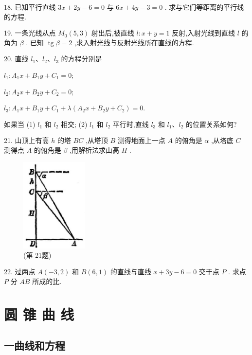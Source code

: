 \documentclass[lang=cn,newtx,10pt,scheme=chinese]{elegantbook}
\begin{document}
18. 已知平行直线 \({3x} + {2y} - 6 = 0\) 与 \({6x} + {4y} - 3 = 0\) . 求与它们等距离的平行线的方程.

19. 一条光线从点 \({M}_{0}\left( {5,3}\right)\) 射出后,被直线 \(l : x + y = 1\) 反射,入射光线到直线 \(l\) 的角为 \(\beta\) . 已知 \(\operatorname{tg}\beta = 2\) ,求入射光线与反射光线所在直线的方程.

20. 直线 \({l}_{1}\text{、}{l}_{2}\text{、}{l}_{3}\) 的方程分别是

\({l}_{1} : {A}_{1}x + {B}_{1}y + {C}_{1} = 0;\)

\({l}_{2} : {A}_{2}x + {B}_{2}y + {C}_{2} = 0;\)

\({l}_{3} : {A}_{1}x + {B}_{1}y + {C}_{1} + \lambda \left( {{A}_{2}x + {B}_{2}y + {C}_{2}}\right) = 0.\)

如果当 (1) \({l}_{1}\) 和 \({l}_{2}\) 相交; (2) \({l}_{1}\) 和 \({l}_{2}\) 平行时,直线 \({l}_{3}\) 和 \({l}_{1}\text{、}{l}_{2}\) 的位置关系如何?

21. 山顶上有高 \(h\) 的塔 \({BC}\) ,从塔顶 \(B\) 测得地面上一点 \(A\) 的俯角是 \(\alpha\) ,从塔底 \(C\) 测得点 \(A\) 的俯角是 \(\beta\) ,用解析法求山高 \(H\) .

\begin{figure}[h]
  \centering
  \includegraphics[max width=0.3\textwidth]{images/01912cc2-ffb6-728e-9ae7-b113ff05c64b_64_551024.jpg}
  \caption{(第 21题)}
\end{figure}



22. 过两点 \(A\left( {-3,2}\right)\) 和 \(B\left( {6,1}\right)\) 的直线与直线 \(x + {3y} - 6 = 0\) 交于点 \(P\) . 求点 \(P\) 分 \(\overline{AB}\) 所成的比.


\chapter{圆 锥 曲 线}

\section*{一\text{ }曲线和方程}
\end{document}
